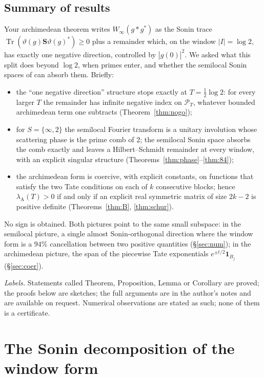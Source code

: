 \documentclass[11pt]{amsart}
\theoremstyle{definition}
\theoremstyle{remark}
\newcommand{\Tr}{\operatorname{Tr}}
\newcommand{\PT}{\mathcal P_T}
\newcommand{\lamA}{\lambda_{\mathrm A}}
\begin{document}
\subsection*{Summary of results}
Your archimedean theorem \cite[Thm.~1 and Thm.~6.11]{CC2021} writes $W_\infty(g*g^*)$ as the Sonin trace
$\Tr(\vartheta(g)\mathbf S\vartheta(g)^*)\ge0$ plus a remainder which, on the window $|I|=\log2$, has exactly
one negative direction, controlled by $|\widehat g(0)|^2$. We asked what this split does beyond
$\log2$, when primes enter, and whether the semilocal Sonin spaces of \cite{CCquasi,CCM2023,CCM2024} can
absorb them. Briefly:
\begin{itemize}
\item[(i)] the ``one negative direction'' structure stops exactly at $T=\frac12\log2$: for every larger $T$ the
remainder has infinite negative index on $\PT$, whatever bounded archimedean term one subtracts
(Theorem~\ref{thm:nogo});
\item[(ii)] for $S=\{\infty,2\}$ the semilocal Fourier transform is a unitary involution whose scattering phase is
the prime comb of $2$; the semilocal Sonin space absorbs the comb exactly and leaves a Hilbert--Schmidt
remainder at every window, with an explicit singular structure (Theorems~\ref{thm:phase}--\ref{thm:84});
\item[(iii)] the archimedean form is coercive, with explicit constants, on functions that satisfy the two Tate
conditions on each of $k$ consecutive blocks; hence $\lamA(T)>0$ if and only if an explicit real symmetric
matrix of size $2k-2$ is positive definite (Theorems~\ref{thm:B}, \ref{thm:schur}).
\end{itemize}
No sign is obtained. Both pictures point to the same small subspace: in the semilocal picture, a single almost Sonin-orthogonal direction where the window form is a $94\%$ cancellation between two positive quantities (\S\ref{sec:num}); in the archimedean picture, the span of the piecewise Tate exponentials $e^{\pm t/2}\mathbf 1_{B_j}$ (\S\ref{sec:coer}).

\emph{Labels.} Statements called Theorem, Proposition, Lemma or Corollary are proved; the proofs below are sketches; the full arguments are in the author's notes and are available on request. Numerical observations are stated as such; none of them is a certificate.

\section{The Sonin decomposition of the window form}\label{sec:sonin}
\end{document}
